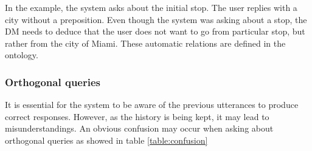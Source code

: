 In the example, the system asks about the initial stop.
The user replies with a city without a preposition.
Even though the system was asking about a stop, the DM needs to deduce that the user does not want to go from particular stop, but rather from the city of Miami.
These automatic relations are defined in the ontology.





\subsubsection{Orthogonal queries}

It is essential for the system to be aware of the previous utterances to produce correct responses.
However, as the history is being kept, it may lead to misunderstandings.
An obvious confusion may occur when asking about orthogonal queries as showed in table \ref{table:confusion}

